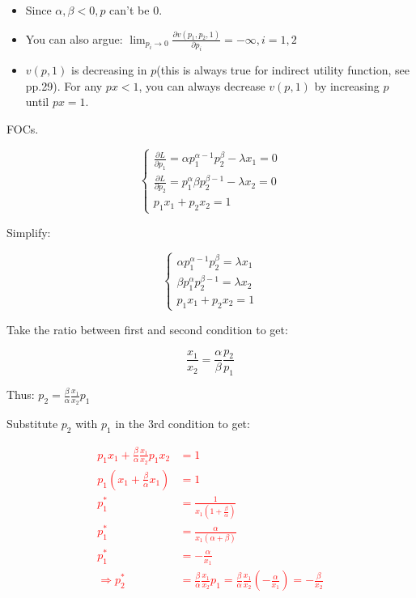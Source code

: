 \documentclass{article}
\begin{document}
\begin{itemize}
\item Since $ \alpha, \beta < 0, p$ can't be $0$.

\item You can also argue: $\lim_{p_i \to 0} \frac{\partial v(p_1,p_2,1)}{\partial p_i} = - \infty, i=1,2$

\item $v(p,1)$ is decreasing in $p$(this is always true for indirect utility function, see pp.29). For any $px<1$, you can always decrease $v(p, 1)$ by increasing $p$ until $px = 1$.
\end{itemize}

FOCs.

\begin{equation}
    \begin{cases}
\frac{\partial L}{\partial p_1} = \alpha p_1^{\alpha - 1} p_2^\beta - \lambda x_1= 0 \\
\frac{\partial L}{\partial p_2} = p_1^{\alpha} \beta p_2^{\beta - 1} - \lambda x_2 = 0 \\
p_1x_1 + p_2x_2 = 1
    \end{cases}
    \nonumber
\end{equation}

Simplify:

\begin{equation}
    \begin{cases}
 \alpha p_1^{\alpha - 1} p_2^\beta = \lambda x_1 \\
 \beta  p_1^{\alpha}  p_2^{\beta - 1} = \lambda x_2  \\
p_1x_1 + p_2x_2 = 1
    \end{cases}
    \label{eq:2_3_foc}   
\end{equation}

Take the ratio between first and second condition to get:

$$\frac{x_1}{x_2} = \frac{\alpha}{\beta} \frac{p_2}{p_1}$$

Thus: $p_2 = \frac{\beta}{\alpha}\frac{x_1}{x_2} p_1 $

Substitute $p_2$ with $p_1$ in the 3rd condition to get:

\textcolor{red}{\begin{align*}
p_1x_1 + \frac{\beta}{\alpha}\frac{x_1}{x_2} p_1  x_2 &= 1 \\
p_1(x_1 + \frac{\beta}{\alpha} x_1) &= 1 \\
p_1^* &= \frac{1}{x_1(1+ \frac{\beta}{\alpha})} \\
p_1^* &= \frac{\alpha}{x_1(\alpha+ \beta)} \\
p_1^* &= -\frac{\alpha}{x_1} \\
\Rightarrow p_2^* &= \frac{\beta}{\alpha} \frac{x_1}{x_2} p_1 =\frac{\beta}{\alpha} \frac{x_1}{x_2}(-\frac{\alpha}{x_1}) = -\frac{\beta}{x_2}
\end{align*}}
\end{document}
